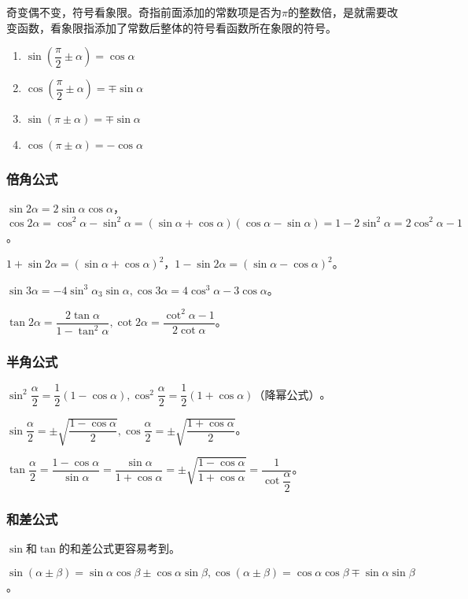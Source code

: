 奇变偶不变，符号看象限。奇指前面添加的常数项是否为$\pi$的整数倍，是就需要改变函数，看象限指添加了常数后整体的符号看函数所在象限的符号。

\begin{enumerate}
    \item $\sin(\dfrac{\pi}{2}\pm\alpha)=\cos\alpha$
    \item $\cos(\dfrac{\pi}{2}\pm\alpha)=\mp\sin\alpha$
    \item $\sin(\pi\pm\alpha)=\mp\sin\alpha$
    \item $\cos(\pi\pm\alpha)=-\cos\alpha$
\end{enumerate}

\subsubsection{倍角公式}

$\sin 2\alpha=2\sin\alpha\cos\alpha$，$\cos 2\alpha=\cos^2\alpha-\sin^2\alpha=(\sin\alpha+\cos\alpha)(\cos\alpha-\sin\alpha)=1-2\sin^2\alpha=2\cos^2\alpha-1$。

$1+\sin2\alpha=(\sin\alpha+\cos\alpha)^2$，$1-\sin2\alpha=(\sin\alpha-\cos\alpha)^2$。

$\sin 3\alpha=-4\sin^3\alpha_3\sin\alpha,\cos 3\alpha=4\cos^3\alpha-3\cos\alpha$。

$\tan 2\alpha=\dfrac{2\tan\alpha}{1-\tan^2\alpha},\cot 2\alpha=\dfrac{\cot^2\alpha-1}{2\cot\alpha}$。

\subsubsection{半角公式}

$\sin^2\dfrac{\alpha}{2}=\dfrac{1}{2}(1-\cos\alpha),\cos^2\dfrac{\alpha}{2}=\dfrac{1}{2}(1+\cos\alpha)\text{（降幂公式）}$。

$\sin\dfrac{\alpha}{2}=\pm\sqrt{\dfrac{1-\cos\alpha}{2}},\cos\dfrac{\alpha}{2}=\pm\sqrt{\dfrac{1+\cos\alpha}{2}}$。

$\tan\dfrac{\alpha}{2}=\dfrac{1-\cos\alpha}{\sin\alpha}=\dfrac{\sin\alpha}{1+\cos\alpha}=\pm\sqrt{\dfrac{1-\cos\alpha}{1+\cos\alpha}}=\dfrac{1}{\cot\dfrac{\alpha}{2}}$。

\subsubsection{和差公式}

$\sin$和$\tan$的和差公式更容易考到。

$\sin(\alpha\pm\beta)=\sin\alpha\cos\beta\pm\cos\alpha\sin\beta,\cos(\alpha\pm\beta)=\cos\alpha\cos\beta\mp\sin\alpha\sin\beta$。

